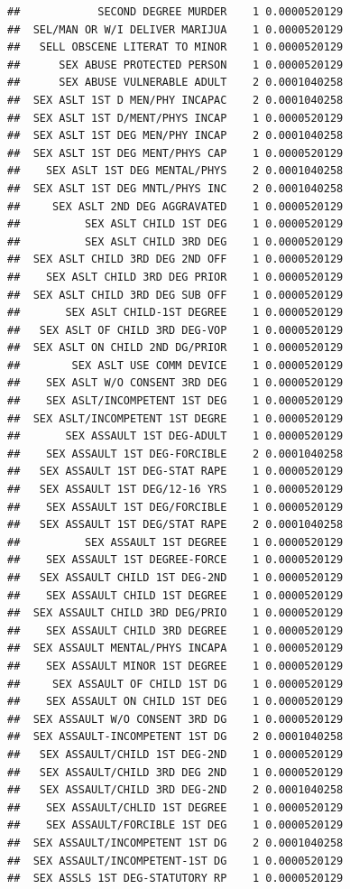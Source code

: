 \documentclass[]{book}
\begin{document}
\begin{verbatim}
##            SECOND DEGREE MURDER    1 0.0000520129
##  SEL/MAN OR W/I DELIVER MARIJUA    1 0.0000520129
##   SELL OBSCENE LITERAT TO MINOR    1 0.0000520129
##      SEX ABUSE PROTECTED PERSON    1 0.0000520129
##      SEX ABUSE VULNERABLE ADULT    2 0.0001040258
##  SEX ASLT 1ST D MEN/PHY INCAPAC    2 0.0001040258
##  SEX ASLT 1ST D/MENT/PHYS INCAP    1 0.0000520129
##  SEX ASLT 1ST DEG MEN/PHY INCAP    2 0.0001040258
##  SEX ASLT 1ST DEG MENT/PHYS CAP    1 0.0000520129
##    SEX ASLT 1ST DEG MENTAL/PHYS    2 0.0001040258
##  SEX ASLT 1ST DEG MNTL/PHYS INC    2 0.0001040258
##     SEX ASLT 2ND DEG AGGRAVATED    1 0.0000520129
##          SEX ASLT CHILD 1ST DEG    1 0.0000520129
##          SEX ASLT CHILD 3RD DEG    1 0.0000520129
##  SEX ASLT CHILD 3RD DEG 2ND OFF    1 0.0000520129
##    SEX ASLT CHILD 3RD DEG PRIOR    1 0.0000520129
##  SEX ASLT CHILD 3RD DEG SUB OFF    1 0.0000520129
##       SEX ASLT CHILD-1ST DEGREE    1 0.0000520129
##   SEX ASLT OF CHILD 3RD DEG-VOP    1 0.0000520129
##  SEX ASLT ON CHILD 2ND DG/PRIOR    1 0.0000520129
##        SEX ASLT USE COMM DEVICE    1 0.0000520129
##    SEX ASLT W/O CONSENT 3RD DEG    1 0.0000520129
##    SEX ASLT/INCOMPETENT 1ST DEG    1 0.0000520129
##  SEX ASLT/INCOMPETENT 1ST DEGRE    1 0.0000520129
##       SEX ASSAULT 1ST DEG-ADULT    1 0.0000520129
##    SEX ASSAULT 1ST DEG-FORCIBLE    2 0.0001040258
##   SEX ASSAULT 1ST DEG-STAT RAPE    1 0.0000520129
##   SEX ASSAULT 1ST DEG/12-16 YRS    1 0.0000520129
##    SEX ASSAULT 1ST DEG/FORCIBLE    1 0.0000520129
##   SEX ASSAULT 1ST DEG/STAT RAPE    2 0.0001040258
##          SEX ASSAULT 1ST DEGREE    1 0.0000520129
##    SEX ASSAULT 1ST DEGREE-FORCE    1 0.0000520129
##   SEX ASSAULT CHILD 1ST DEG-2ND    1 0.0000520129
##    SEX ASSAULT CHILD 1ST DEGREE    1 0.0000520129
##  SEX ASSAULT CHILD 3RD DEG/PRIO    1 0.0000520129
##    SEX ASSAULT CHILD 3RD DEGREE    1 0.0000520129
##  SEX ASSAULT MENTAL/PHYS INCAPA    1 0.0000520129
##    SEX ASSAULT MINOR 1ST DEGREE    1 0.0000520129
##     SEX ASSAULT OF CHILD 1ST DG    1 0.0000520129
##    SEX ASSAULT ON CHILD 1ST DEG    1 0.0000520129
##  SEX ASSAULT W/O CONSENT 3RD DG    1 0.0000520129
##  SEX ASSAULT-INCOMPETENT 1ST DG    2 0.0001040258
##   SEX ASSAULT/CHILD 1ST DEG-2ND    1 0.0000520129
##   SEX ASSAULT/CHILD 3RD DEG 2ND    1 0.0000520129
##   SEX ASSAULT/CHILD 3RD DEG-2ND    2 0.0001040258
##    SEX ASSAULT/CHLID 1ST DEGREE    1 0.0000520129
##    SEX ASSAULT/FORCIBLE 1ST DEG    1 0.0000520129
##  SEX ASSAULT/INCOMPETENT 1ST DG    2 0.0001040258
##  SEX ASSAULT/INCOMPETENT-1ST DG    1 0.0000520129
##  SEX ASSLS 1ST DEG-STATUTORY RP    1 0.0000520129

\end{verbatim}
\end{document}
